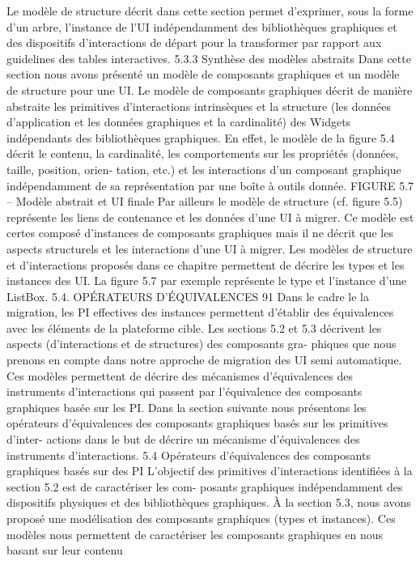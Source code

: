 \documentclass{article}
\begin{document}
Le modèle de structure décrit dans cette section permet d’exprimer, sous la forme d’un arbre,
l’instance de l’UI indépendamment des bibliothèques graphiques et des dispositifs d’interactions de
départ pour la transformer par rapport aux guidelines des tables interactives.
5.3.3
Synthèse des modèles abstraits
Dans cette section nous avons présenté un modèle de composants graphiques et un modèle de
structure pour une UI. Le modèle de composants graphiques décrit de manière abstraite les primitives
d’interactions intrinsèques et la structure (les données d’application et les données graphiques et la
cardinalité) des Widgets indépendants des bibliothèques graphiques. En effet, le modèle de la ﬁgure 5.4
décrit le contenu, la cardinalité, les comportements sur les propriétés (données, taille, position, orien-
tation, etc.) et les interactions d’un composant graphique indépendamment de sa représentation par
une boîte à outils donnée.
FIGURE 5.7 – Modèle abstrait et UI ﬁnale
Par ailleurs le modèle de structure (cf. ﬁgure 5.5) représente les liens de contenance et les données
d’une UI à migrer. Ce modèle est certes composé d’instances de composants graphiques mais il ne
décrit que les aspects structurels et les interactions d’une UI à migrer.
Les modèles de structure et d’interactions proposés dans ce chapitre permettent de décrire les
types et les instances des UI. La ﬁgure 5.7 par exemple représente le type et l’instance d’une ListBox.
5.4. OPÉRATEURS D’ÉQUIVALENCES
91
Dans le cadre le la migration, les PI effectives des instances permettent d’établir des équivalences avec
les éléments de la plateforme cible.
Les sections 5.2 et 5.3 décrivent les aspects (d’interactions et de structures) des composants gra-
phiques que nous prenons en compte dans notre approche de migration des UI semi automatique.
Ces modèles permettent de décrire des mécanismes d’équivalences des instruments d’interactions qui
passent par l’équivalence des composants graphiques basée sur les PI. Dans la section suivante nous
présentons les opérateurs d’équivalences des composants graphiques basés sur les primitives d’inter-
actions dans le but de décrire un mécanisme d’équivalences des instruments d’interactions.
5.4
Opérateurs d’équivalences des composants graphiques basés sur
des PI
L’objectif des primitives d’interactions identiﬁées à la section 5.2 est de caractériser les com-
posants graphiques indépendamment des dispositifs physiques et des bibliothèques graphiques. À la
section 5.3, nous avons proposé une modélisation des composants graphiques (types et instances). Ces
modèles nous permettent de caractériser les composants graphiques en nous basant sur leur contenu
\end{document}
